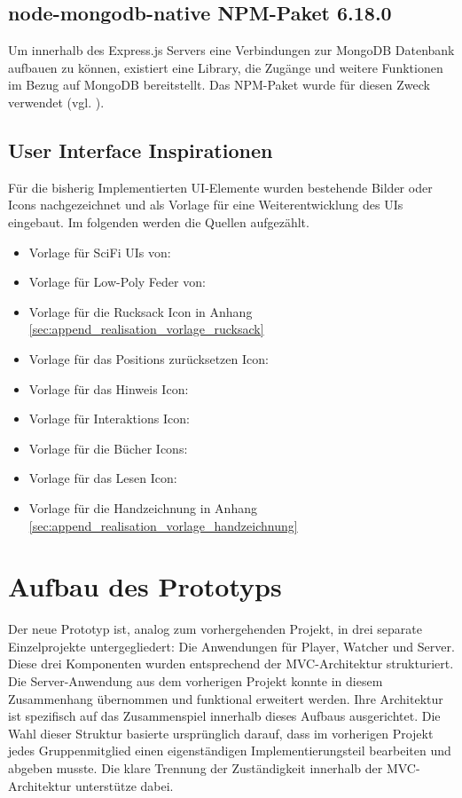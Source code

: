 \subsection{node-mongodb-native NPM-Paket 6.18.0}
Um innerhalb des Express.js Servers eine Verbindungen zur MongoDB Datenbank aufbauen zu können, existiert eine Library, die Zugänge und weitere Funktionen im Bezug auf MongoDB bereitstellt. Das \ac{NPM}-Paket  wurde für diesen Zweck verwendet (vgl. \citealp{mongodb_mongodbnode-mongodb-native_2025}).


\subsection{User Interface Inspirationen}\label{sec:user-interface-inspirations}
Für die bisherig Implementierten \ac{UI}-Elemente wurden bestehende Bilder oder Icons nachgezeichnet und als Vorlage für eine Weiterentwicklung des \ac{UI}s eingebaut. Im folgenden werden die Quellen aufgezählt.

\begin{itemize}
    \item Vorlage für SciFi \ac{UI}s von: \cite{pchvector_free_nodate,pchvector_different_nodate}
    \item Vorlage für Low-Poly Feder von: \cite{masud_download_nodate}
    \item Vorlage für die Rucksack Icon in Anhang \ref{sec:append_realisation_vorlage_rucksack}
    \item Vorlage für das Positions zurücksetzen Icon: \cite{noauthor_chatgpt_2025}
    \item Vorlage für das Hinweis Icon: \cite{noauthor_chatgpt_2025-1}
    \item Vorlage für Interaktions Icon: \cite{noauthor_chatgpt_2024}
    \item Vorlage für die Bücher Icons: \cite{fabrica_book_2019}
    \item Vorlage für das Lesen Icon: \cite{noauthor_chatgpt_2025}
    \item Vorlage für die Handzeichnung in Anhang \ref{sec:append_realisation_vorlage_handzeichnung}
\end{itemize}

\section{Aufbau des Prototyps}

Der neue Prototyp ist, analog zum vorhergehenden Projekt, in drei separate Einzelprojekte untergegliedert: Die Anwendungen für Player, Watcher und Server. Diese drei Komponenten wurden entsprechend der \ac{MVC}-Architektur strukturiert. Die Server-Anwendung aus dem vorherigen Projekt konnte in diesem Zusammenhang übernommen und funktional erweitert werden. Ihre Architektur ist spezifisch auf das Zusammenspiel innerhalb dieses Aufbaus ausgerichtet. Die Wahl dieser Struktur basierte ursprünglich darauf, dass im vorherigen Projekt jedes Gruppenmitglied einen eigenständigen Implementierungsteil bearbeiten und abgeben musste. Die klare Trennung der Zuständigkeit innerhalb der \ac{MVC}-Architektur unterstütze dabei.


